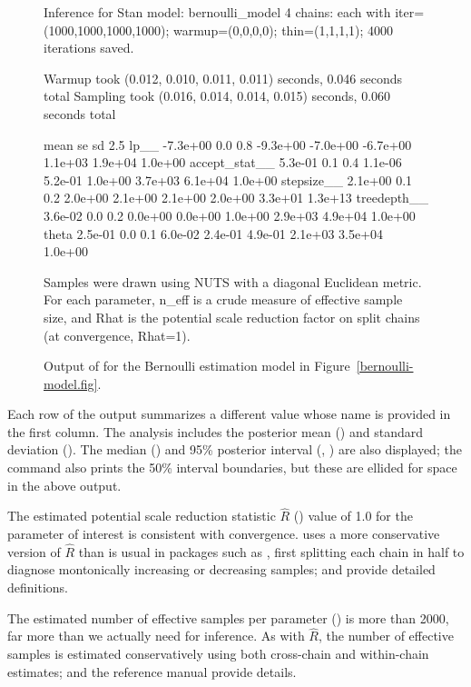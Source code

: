 \documentclass[article]{jss}
\begin{document}
\begin{figure}
\small
\begin{Code}
Inference for Stan model: bernoulli_model
4 chains: each with iter=(1000,1000,1000,1000); warmup=(0,0,0,0); thin=(1,1,1,1); 
4000 iterations saved.

Warmup took (0.012, 0.010, 0.011, 0.011) seconds, 0.046 seconds total
Sampling took (0.016, 0.014, 0.014, 0.015) seconds, 0.060 seconds total

                  mean   se   sd     2.5%
lp__          -7.3e+00  0.0  0.8 -9.3e+00 -7.0e+00 -6.7e+00 1.1e+03 1.9e+04 1.0e+00
accept_stat__  5.3e-01  0.1  0.4  1.1e-06  5.2e-01  1.0e+00 3.7e+03 6.1e+04 1.0e+00
stepsize__     2.1e+00  0.1  0.2  2.0e+00  2.1e+00  2.1e+00 2.0e+00 3.3e+01 1.3e+13
treedepth__    3.6e-02  0.0  0.2  0.0e+00  0.0e+00  1.0e+00 2.9e+03 4.9e+04 1.0e+00
theta          2.5e-01  0.0  0.1  6.0e-02  2.4e-01  4.9e-01 2.1e+03 3.5e+04 1.0e+00

Samples were drawn using NUTS with a diagonal Euclidean metric.
For each parameter, n_eff is a crude measure of effective sample size,
and Rhat is the potential scale reduction factor on split chains (at 
convergence, Rhat=1).
\end{Code}
\caption{Output of  for the Bernoulli estimation model in
  Figure~\ref{bernoulli-model.fig}.}\label{print-output.fig}
\end{figure}
%
Each row of the output summarizes a different value whose name is
provided in the first column.  The analysis includes the posterior
mean () and standard deviation ().  The median
() and 95\% posterior interval (, )
are also displayed; the  command also prints the 50\%
interval boundaries, but these are ellided for space in the above
output.

The estimated potential scale reduction statistic $\hat{R}$
() value of 1.0 for the parameter of interest 
is consistent with convergence.   uses a more
conservative version of $\hat{R}$ than is usual in packages such as
 \citep{PlummerEtAl:2006}, first splitting each chain in half to diagnose
montonically increasing or decreasing samples; \citep{GelmanEtAl:2013}
and \citep{Stan:2013} provide detailed definitions.

The estimated number of effective samples per parameter
() is more than 2000, far more than we actually need for
inference.  As with $\hat{R}$, the number of effective samples is
estimated conservatively using both cross-chain and within-chain
estimates; \citep{GelmanEtAl:2013} and the reference manual provide
details.
\end{document}
